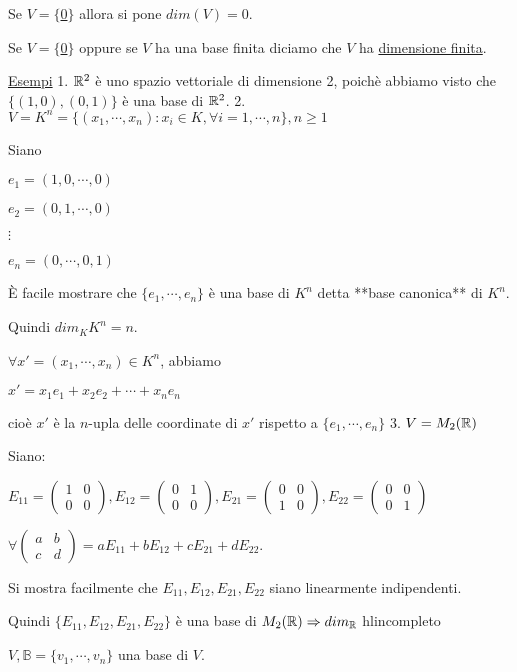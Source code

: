 \documentclass{article}
\begin{document}
Se $V=\{$\ul{0}$\}$ allora si pone $dim(V)=0$.

Se $V=\{$\ul{0}$\}$ oppure se $V$ ha una base finita diciamo che $V$ ha \ul{dimensione finita}.

\ul{Esempi}
1. $\mathbb{R}^2$ è uno spazio vettoriale di dimensione 2, poichè abbiamo visto che $\{(1,0),(0,1)\}$ è una base di $\mathbb{R}^2$.
2. $V=K^n=\{(x_1,\cdots,x_n):x_i\in K,\forall i=1,\cdots,n\},n\ge 1$

    Siano

    $e_1=(1,0,\cdots,0)$

    $e_2=(0,1,\cdots,0)$

    $\vdots$

    $e_n=(0,\cdots,0,1)$

    È facile mostrare che $\{e_1,\cdots,e_n\}$ è una base di $K^n$ detta **base canonica** di $K^n$.

    Quindi $dim_KK^n=n$.

    $\forall x'=(x_1,\cdots,x_n)\in K^n$, abbiamo

    $x'=x_1e_1+x_2e_2+\cdots+x_ne_n$

    cioè $x'$ è la $n$-upla delle coordinate di $x'$ rispetto a $\{e_1,\cdots,e_n\}$
3. $V=M_2(\mathbb{R})$

    Siano:

    $E_{11}=\begin{pmatrix}1&0\\0&0\end{pmatrix},E_{12}=\begin{pmatrix}0&1\\0&0\end{pmatrix},E_{21}=\begin{pmatrix}0&0\\1&0\end{pmatrix},E_{22}=\begin{pmatrix}0&0\\0&1\end{pmatrix}$

    $\forall\begin{pmatrix}a&b\\c&d\end{pmatrix}=aE_{11}+bE_{12}+cE_{21}+dE_{22}$.

    Si mostra facilmente che $E_{11},E_{12},E_{21},E_{22}$ siano linearmente indipendenti.

    Quindi $\{E_{11},E_{12},E_{21},E_{22}\}$ è una base di $M_2(\mathbb{R})\Rightarrow dim_{\mathbb{R}}$ hl{incompleto}

$V,\mathbb{B}=\{v_1,\cdots,v_n\}$ una base di $V$.
\end{document}
